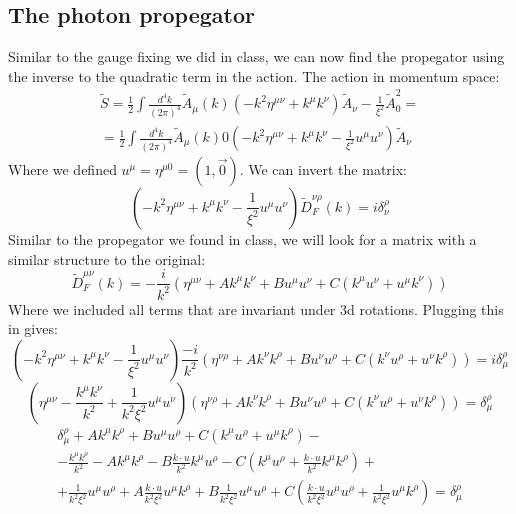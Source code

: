 \documentclass{article}
\begin{document}
\subsection{The photon propegator}
Similar to the gauge fixing we did in class, we can now find the propegator using the inverse to the quadratic term in the action. The action in momentum space:
\begin{equation}
\begin{gathered}
    \tilde{S} = \frac{1}{2} \int \frac{d^4k}{(2\pi)^4}\tilde{A}_\mu(k) (-k^2 \eta^{\mu\nu} + k^\mu k^\nu)\tilde{A}_\nu - \frac{1}{\xi^2}\tilde{A}_0^2 = \\ =
    \frac{1}{2} \int \frac{d^4k}{(2\pi)^4}\tilde{A}_\mu(k)0\left(-k^2 \eta^{\mu\nu} + k^\mu k^\nu - \frac{1}{\xi^2}u^{\mu}u^{\nu}\right)\tilde{A}_\nu
\end{gathered}
\end{equation}
Where we defined $u^\mu = \eta^{\mu0} = (1, \vec{0})$. We can invert the matrix:
\begin{equation}
    \left(-k^2 \eta^{\mu\nu} + k^\mu k^\nu - \frac{1}{\xi^2}u^{\mu}u^{\nu}\right) \tilde{D}_F^{\nu\rho}(k) = i\delta^\rho_\nu
\end{equation}
Similar to the propegator we found in class, we will look for a matrix with a similar structure to the original:
\begin{equation}
    \tilde{D}_F^{\mu\nu}(k) = -\frac{i}{k^2} \left(\eta^{\mu\nu} + A k^{\mu}k^{\nu} + B u^{\mu}u^{\nu} + C(k^{\mu}u^{\nu} + u^{\mu}k^{\nu})\right)
\end{equation}
Where we included all terms that are invariant under 3d rotations. Plugging this in gives:
\begin{equation}
    \left(-k^2 \eta^{\mu\nu} + k^\mu k^\nu - \frac{1}{\xi^2}u^{\mu}u^{\nu}\right) \frac{-i}{k^2} \left(\eta^{\nu\rho} + A k^{\nu}k^{\rho} + B u^{\nu}u^{\rho} + C(k^{\nu}u^{\rho} + u^{\nu}k^{\rho})\right) = i\delta^\rho_\mu
\end{equation}
\begin{equation}
    \left(\eta^{\mu\nu} - \frac{k^\mu k^\nu}{k^2} + \frac{1}{k^2\xi^2}u^{\mu}u^{\nu}\right) \left(\eta^{\nu\rho} + A k^{\nu}k^{\rho} + B u^{\nu}u^{\rho} + C(k^{\nu}u^{\rho} + u^{\nu}k^{\rho})\right) = \delta^\rho_\mu
\end{equation}
\begin{equation}
\begin{gathered}
    \delta^{\rho}_{\mu} + A k^{\mu}k^{\rho} + B u^{\mu}u^{\rho} + C(k^{\mu}u^{\rho} + u^{\mu}k^{\rho}) - \\ -
    \frac{k^\mu k^\rho}{k^2} - Ak^\mu k^\rho - B \frac{k\cdot u}{k^2} k^\mu u^\rho - C \left(k^\mu u^{\rho} + \frac{k\cdot u}{k^2} k^{\mu}k^{\rho}\right) + \\ +
    \frac{1}{k^2\xi^2}u^{\mu}u^{\rho} + A \frac{k\cdot u}{k^2\xi^2} u^{\mu}k^{\rho} + B \frac{1}{k^2\xi^2} u^{\mu}u^{\rho} + C\left(\frac{k\cdot u}{k^2\xi^2}u^{\mu}u^{\rho} + \frac{1}{k^2\xi^2}u^{\mu}k^{\rho}\right) = \delta^\rho_\mu
\end{gathered}
\end{equation}
\end{document}

